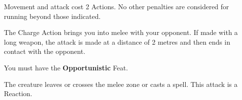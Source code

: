 \documentclass[landscape,10pt,a4paper]{article}
\begin{document}
\begin{multicols}{3}
\begin{dmbox}[title=Charge - page \pageref{charge}]
Movement and attack cost 2 Actions. No other penalties are considered for running beyond those indicated.

The Charge Action brings you into melee with your opponent. If made with a long weapon, the attack is made at a distance of 2 metres and then ends in contact with the opponent.
\end{dmbox}

\begin{dmbox}[title=Opportunity Attack - page \pageref{attaccoopportunita}]
You must have the \textbf{Opportunistic} Feat.

The creature leaves or crosses the melee zone or casts a spell. This attack is a Reaction.
\end{dmbox}

\begin{dmbox}[title=Actions per Round - page \pageref{azioninelround}]


\end{dmbox}
\end{multicols}
\end{document}
